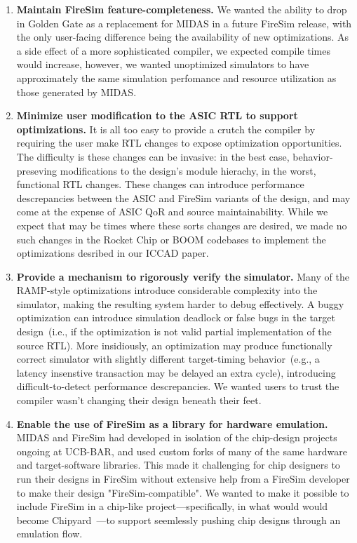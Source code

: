 \begin{enumerate}
\item \textbf{Maintain FireSim feature-completeness.} We wanted the ability to
drop in Golden Gate as a replacement for MIDAS in a future FireSim release, with the
only user-facing difference being the availability of new
optimizations. As a side effect of a more sophisticated compiler, we expected
compile times would increase, however, we wanted unoptimized simulators to have
approximately the same simulation perfomance and resource utilization as those generated by MIDAS.

\item \textbf{Minimize user modification to the ASIC RTL to support optimizations.} It is all too easy to
provide a crutch the compiler by requiring the user make RTL changes to expose
optimization opportunities. The difficulty is these changes can be
invasive: in the best case, behavior-preseving modifications to the design's
module hierachy, in the worst, functional RTL changes. These changes can introduce
performance descrepancies between the ASIC and FireSim variants of the
design, and may come at the expense of ASIC QoR and source maintainability. While we expect that
may be times where these sorts changes are desired, we made no such
changes in the Rocket Chip or BOOM codebases to implement the optimizations
desribed in our ICCAD paper.

\item \textbf{Provide a mechanism to rigorously verify the simulator.} Many of
the RAMP-style optimizations introduce considerable complexity into the
simulator, making the resulting system harder to debug
effectively. A buggy optimization can introduce simulation deadlock or false
bugs in the target design~(i.e., if the optimization is not valid partial implementation of the source RTL).
More insidiously, an optimization may produce functionally correct simulator with slightly
different target-timing behavior~(e.g., a latency insenstive transaction may be delayed an extra cycle), introducing difficult-to-detect performance
descrepancies. We wanted users to trust the compiler wasn't changing their
design beneath their feet.

\item \textbf{Enable the use of FireSim as a library for hardware emulation.}
MIDAS and FireSim had developed in isolation of the chip-design projects
ongoing at UCB-BAR, and used custom forks of many of the same hardware and
target-software libraries. This made it challenging for chip designers to run
their designs in FireSim without extensive help from a FireSim developer to make their design "FireSim-compatible". We
wanted to make it possible to include FireSim in a chip-like project---specifically, in what would
would become Chipyard~\cite{Chipyard}---to support seemlessly pushing chip
designs through an emulation flow.
\end{enumerate}

